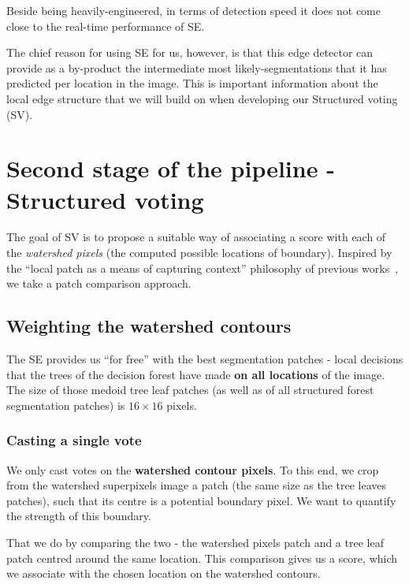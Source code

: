 Beside being heavily-engineered, in terms of detection speed it does not come close to the real-time performance of SE.

The chief reason for using SE for us, however, is that this edge detector can provide as a by-product the intermediate most likely-segmentations that it has predicted per location in the image. This is important information about the local edge structure that we will build on when developing our Structured voting (SV).

\section{Second stage of the pipeline - Structured voting}
\label{sec:ch4-SE-SV-UCM_SV_details}
The goal of SV is to propose a suitable way of associating a score with each of the {\it watershed pixels} (the computed possible locations of boundary). Inspired by the ``local patch as a means of capturing context'' philosophy of previous works~\cite{dollar2006supervised,LimZD13,DollarICCV13edges}, we take a patch comparison approach.

\subsection{Weighting the watershed contours} %
The SE provides us ``for free'' with the best segmentation patches - local decisions that the trees of the decision forest have made {\bf on all locations} of the image. The size of those medoid tree leaf patches (as well as of all structured forest segmentation patches) is $16\times 16$ pixels.

\subsubsection*{Casting a single vote}
We only cast votes on the {\bf watershed contour pixels}. To this end, we crop from the watershed superpixels image a patch (the same size as the tree leaves patches), such that its centre is a potential boundary pixel. We want to quantify the strength of this boundary. 

That we do by comparing the two - the watershed pixels patch and a tree leaf patch centred around the same location. This comparison gives us a score, which we associate with the chosen location on the watershed contours.

